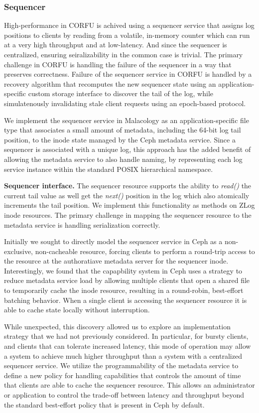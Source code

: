 \documentclass[10pt,twocolumn]{article}
\begin{document}
\subsubsection{Sequencer}

High-performance in CORFU is achived using a sequencer service that assigns
log positions to clients by reading from a volatile, in-memory counter which
can run at a very high throughput and at low-latency. And since the sequencer
is centralized, ensuring seiralizability in the common case is trivial.  The
primary challenge in CORFU is handling the failure of the sequencer in a way
that preserves correctness. Failure of the sequencer service in CORFU is
handled by a recovery algorithm that recomputes the new sequencer state using
an application-specific custom storage interface to discover the tail of the
log, while simulatenously invalidating stale client requests using an
epoch-based protocol.

We implement the sequencer service in Malacology as an application-specific
file type that associates a small amount of metadata, including the 64-bit log
tail position, to the inode state managed by the Ceph metadata service. Since
a sequencer is associated with a unique log, this approach has the added
benefit of allowing the metadata service to also handle naming, by
representing each log service instance within the standard POSIX hierarchical
namespace.

{\bf Sequencer interface.} The sequencer resource supports the ability to
\emph{read()} the current tail value as well get the \emph{next()} position in
the log which also atomically increments the tail position. We implement this
functionality as methods on ZLog inode resources. The primary challenge in
mapping the sequencer resource to the metadata service is handling
serialization correctly.

Initially we sought to directly model the sequencer service in Ceph as a
non-exclusive, non-cacheable resource, forcing clients to perform a round-trip
access to the resource at the authoratiave metadata server for the sequencer
inode.  Interestingly, we found that the capapbility system in Ceph uses a
strategy to reduce metadata service load by allowing multiple clients that
open a shared file to temporarily cache the inode resource, resulting in a
round-robin, best-effort batching behavior. When a single client is accessing
the sequencer resource it is able to cache state locally without interruption.

While unexpected, this discovery allowed us to explore an implementation
strategy that we had not previously considered. In particular, for bursty
clients, and clients that can tolerate increased latency, this mode of operation may
allow a system to achieve much higher throughput than a system with a
centralized sequencer service.
We utilize the programmability of the metadata service to define a new policy
for handling capabilities that controls the amount of time that clients are
able to cache the sequencer resource. This allows an administrator or
application to control the trade-off between latency and throughput beyond the
standard best-effort policy that is present in Ceph by default.
\end{document}
